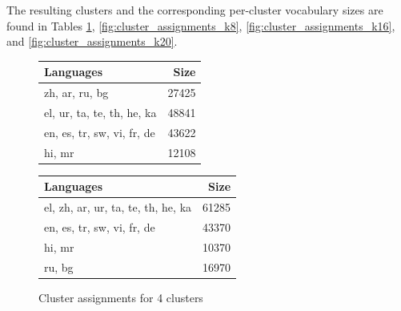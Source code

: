 The resulting clusters and the corresponding per-cluster vocabulary sizes are found in Tables \ref{fig:cluster_assignments_k4}, \ref{fig:cluster_assignments_k8}, \ref{fig:cluster_assignments_k16}, and \ref{fig:cluster_assignments_k20}.

\begin{figure}[p]
    \centering
    
    \begin{subtable}{0.49\textwidth}
        \centering
        \begin{tabular}{lr}
            \toprule
            Languages & Size \\
            \midrule
            zh, ar, ru, bg & 27425 \\
            el, ur, ta, te, th, he, ka & 48841 \\
            en, es, tr, sw, vi, fr, de & 43622 \\
            hi, mr & 12108 \\
            \bottomrule
        \end{tabular}
        \caption{\citet{chung_improving_2020}}
        \label{tab:chung_clusters_k4}
        

    \end{subtable}
    \hfill
    \begin{subtable}{0.49\textwidth}
        \centering
        \begin{tabular}{lr}
        \toprule
        Languages & Size \\
        \midrule
        el, zh, ar, ur, ta, te, th, he, ka & 61285 \\
        en, es, tr, sw, vi, fr, de & 43370 \\
        hi, mr & 10370 \\
        ru, bg & 16970 \\
        \bottomrule
        \end{tabular}
        \caption{\citet{liang_xlm-v_2023}}
        \label{tab:liang_clusters_k4}
    \end{subtable}

    \caption{Cluster assignments for 4 clusters}
    \label{fig:cluster_assignments_k4}
\end{figure}

